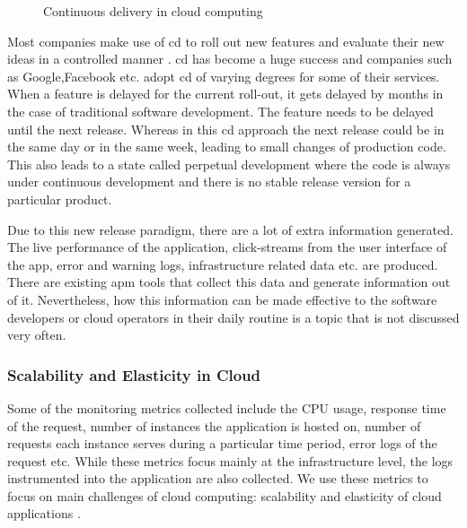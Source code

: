 \documentclass[article,type=msc,colorback,12pt,accentcolor=tud8b,table]{tudthesis}
\begin{document}
		\begin{figure}
			\begin{center}
			\end{center}
			\caption{Continuous delivery in cloud computing \cite{humble2010continuous}}
			\label{fig:cd}
		\end{figure}
		
		Most companies make use of \gls{cd} to roll out new features and evaluate their new ideas in a controlled manner \cite{kohavi2007practical}. \gls{cd} has become a huge success and companies such as Google,Facebook etc. adopt \gls{cd} of varying degrees for some of their services. When a feature is delayed for the current roll-out, it gets delayed by months in the case of traditional software development. The feature needs to be delayed until the next release. Whereas in this \gls{cd} approach the next release could be in the same day or in the same week, leading to small changes of production code. This also leads to a state called perpetual development where the code is always under continuous development and there is no stable release version for a particular product.  	\par Due to this new release paradigm, there are a lot of extra information generated. The live performance of the application, click-streams from the user interface of the app, error and warning logs, infrastructure related data etc. are produced. There are existing \gls{apm} tools that collect this data and generate information out of it. Nevertheless, how this information can be made effective to the software developers or cloud operators in their daily routine is a topic that is not discussed very often. 
		
		\subsubsection{Scalability and Elasticity  in Cloud}
		
		Some of the monitoring metrics collected include the CPU usage, response time of the request, number of instances the application is hosted on, number of requests each instance serves during a particular time period, error logs of the request etc. While these metrics focus mainly at the infrastructure level, the logs instrumented into the application are also collected. We use these metrics to focus on main challenges of cloud computing: scalability and elasticity of cloud applications \cite{furht2010handbook}.
		
\end{document}
